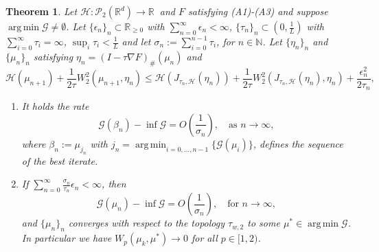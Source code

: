 \documentclass[11pt]{article}
\DeclareMathOperator*{\argmin}{arg\,min}
\newtheorem{theorem}{Theorem}[section]
\newcommand{\cP}{\mathcal{P}}
\newcommand{\cG}{\mathcal{G}}
\newcommand{\R}{\mathbb{R}}
\numberwithin{equation}{section}
\begin{document}
\begin{theorem}\label{thm:PG_convergence2}
	Let $\mathcal{H} : \cP_2(\R^d) \to \mathbb{R} \ $ and $F$ satisfying (A1)-(A3) and suppose $\argmin \cG \neq \emptyset$. Let $\{\epsilon_n\}_n\subset \mathbb{R}_{\geq 0}$ with $\sum_{n=0}^{\infty} \epsilon_n < \infty$, $\{\tau_n\}_n \subset \left(0,\frac{1}{L}\right)$ with $\sum_{i=0}^{\infty}\tau_i= \infty$, $\sup_i \tau_i < \frac{1}{L}$ and let $\sigma_n:= \sum_{i=0}^{n-1}\tau_i$, for $n\in\mathbb{N}$. Let $\{\eta_n\}_n$ and $\{\mu_n\}_n$ satisfying $\eta_{n}=(I-\tau \nabla F)_{\#}(\mu_n)$ and
	\begin{equation}\label{eq:second_error_final}
		\mathcal{H}(\mu_{n+1})+\frac{1}{2\tau}W_2^2(\mu_{n+1},\eta_{n})\leq \mathcal{H}(J_{\tau_n,\mathcal{H}}(\eta_{n}))+\frac{1}{2\tau}W_2^2(J_{\tau_n,\mathcal{H}}(\eta_{n}),\eta_{n})+ \frac{\epsilon_n^2}{2\tau_n},
	\end{equation}
	\begin{enumerate}
		\item It holds the rate
		\begin{equation}\label{eq:rate_PG_bar2}
			\cG(\beta_n)-\inf \cG = O\left(\frac{1}{\sigma_n}\right), \quad \text{as } n\to \infty,
		\end{equation}
		where $\beta_n := \mu_{j_n}$ with $j_n = \argmin_{i=0,\dots,n-1}\{\cG(\mu_i)\}$, defines the sequence of the best iterate.
		\item If $\sum_{n=0}^{\infty}\frac{\sigma_n}{\tau_n}\epsilon_{n}  < \infty$, then \[\cG(\mu_n)-\inf \cG = O\left(\frac{1}{\sigma_n}\right), \quad \text{for } n\to \infty,\] and $\{\mu_n\}_n$ converges with respect to the topology $\tau_{w,2}$ to some $\mu^*\in \argmin \cG$. In particular we have $W_p(\mu_k,\mu^*)\to 0$ for all $p\in[1,2)$.
	\end{enumerate}
\end{theorem}
\end{document}

